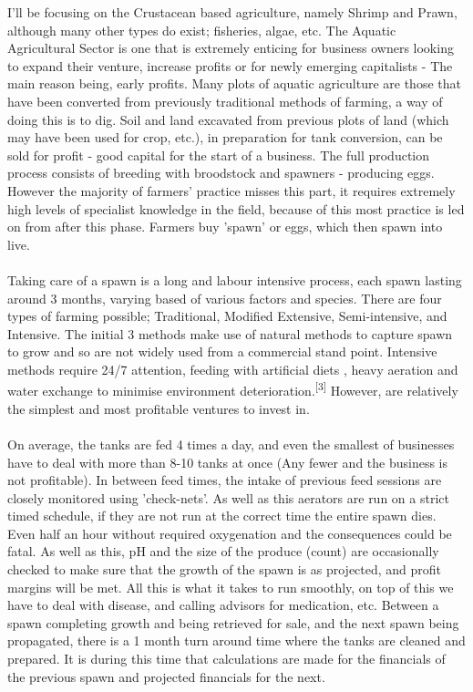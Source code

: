 \documentclass[a4paper,11pt]{proc}
\begin{document}
I'll be focusing on the Crustacean based agriculture, namely Shrimp and Prawn, although many other types do exist; fisheries, algae, etc. The Aquatic Agricultural Sector is one that is extremely enticing for business owners looking to expand their venture, increase profits or for newly emerging capitalists - The main reason being, early profits. Many plots of aquatic agriculture are those that have been converted from previously traditional methods of farming, a way of doing this is to dig. Soil and land excavated from previous plots of land (which may have been used for crop, etc.), in preparation for tank conversion, can be sold for profit - good capital for the start of a business. The full production process consists of breeding with broodstock and spawners - producing eggs. However the majority of farmers' practice misses this part, it requires extremely high levels of specialist knowledge in the field, because of this most practice is led on from after this phase. Farmers buy 'spawn' or eggs, which then spawn into live.\\ 
\\Taking care of a spawn is a long and labour intensive process, each spawn lasting around 3 months, varying based of various factors and species. There are four types of farming possible; Traditional, Modified Extensive, Semi-intensive, and Intensive. The initial 3 methods make use of natural methods to capture spawn to grow and so are not widely used from a commercial stand point. Intensive methods require 24/7 attention, feeding with artificial diets , heavy aeration and water exchange to minimise environment deterioration.\textsuperscript{[3]} However, are relatively the simplest and most profitable ventures to invest in.\\
\\On average, the tanks are fed 4 times a day, and even the smallest of businesses have to deal with more than 8-10 tanks at once (Any fewer and the business is not profitable). In between feed times, the intake of previous feed sessions are closely monitored using 'check-nets'. As well as this aerators are run on a strict timed schedule, if they are not run at the correct time the entire spawn dies. Even half an hour without required oxygenation and the consequences could be fatal. As well as this, pH and the size of the produce (count) are occasionally checked to make sure that the growth of the spawn is as projected, and profit margins will be met. All this is what it takes to run smoothly, on top of this we have to deal with disease, and calling advisors for medication, etc. Between a spawn completing growth and being retrieved for sale, and the next spawn being propagated, there is a 1 month turn around time where the tanks are cleaned and prepared. It is during this time that calculations are made for the financials of the previous spawn and projected financials for the next.\\
\end{document}
